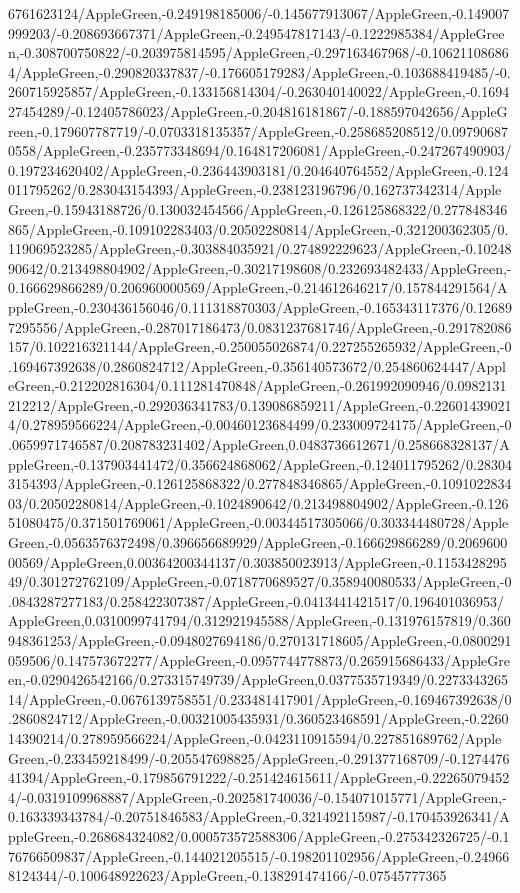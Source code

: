 {\begin{tikzternal}
{6761623124/AppleGreen,-0.249198185006/-0.145677913067/AppleGreen,-0.149007999203/-0.208693667371/AppleGreen,-0.249547817143/-0.1222985384/AppleGreen,-0.308700750822/-0.203975814595/AppleGreen,-0.297163467968/-0.106211086864/AppleGreen,-0.290820337837/-0.176605179283/AppleGreen,-0.103688419485/-0.260715925857/AppleGreen,-0.133156814304/-0.263040140022/AppleGreen,-0.169427454289/-0.12405786023/AppleGreen,-0.204816181867/-0.188597042656/AppleGreen,-0.179607787719/-0.0703318135357/AppleGreen,-0.258685208512/0.097906870558/AppleGreen,-0.235773348694/0.164817206081/AppleGreen,-0.247267490903/0.197234620402/AppleGreen,-0.236443903181/0.204640764552/AppleGreen,-0.124011795262/0.283043154393/AppleGreen,-0.238123196796/0.162737342314/AppleGreen,-0.15943188726/0.130032454566/AppleGreen,-0.126125868322/0.277848346865/AppleGreen,-0.109102283403/0.20502280814/AppleGreen,-0.321200362305/0.119069523285/AppleGreen,-0.303884035921/0.274892229623/AppleGreen,-0.1024890642/0.213498804902/AppleGreen,-0.30217198608/0.232693482433/AppleGreen,-0.166629866289/0.206960000569/AppleGreen,-0.214612646217/0.157844291564/AppleGreen,-0.230436156046/0.111318870303/AppleGreen,-0.165343117376/0.126897295556/AppleGreen,-0.287017186473/0.0831237681746/AppleGreen,-0.291782086157/0.102216321144/AppleGreen,-0.250055026874/0.227255265932/AppleGreen,-0.169467392638/0.2860824712/AppleGreen,-0.356140573672/0.254860624447/AppleGreen,-0.212202816304/0.111281470848/AppleGreen,-0.261992090946/0.0982131212212/AppleGreen,-0.292036341783/0.139086859211/AppleGreen,-0.226014390214/0.278959566224/AppleGreen,-0.00460123684499/0.233009724175/AppleGreen,-0.0659971746587/0.208783231402/AppleGreen,0.0483736612671/0.258668328137/AppleGreen,-0.137903441472/0.356624868062/AppleGreen,-0.124011795262/0.283043154393/AppleGreen,-0.126125868322/0.277848346865/AppleGreen,-0.109102283403/0.20502280814/AppleGreen,-0.1024890642/0.213498804902/AppleGreen,-0.12651080475/0.371501769061/AppleGreen,-0.00344517305066/0.303344480728/AppleGreen,-0.0563576372498/0.396656689929/AppleGreen,-0.166629866289/0.206960000569/AppleGreen,0.00364200344137/0.303850023913/AppleGreen,-0.115342829549/0.301272762109/AppleGreen,-0.0718770689527/0.358940080533/AppleGreen,-0.0843287277183/0.258422307387/AppleGreen,-0.0413441421517/0.196401036953/AppleGreen,0.0310099741794/0.312921945588/AppleGreen,-0.131976157819/0.360948361253/AppleGreen,-0.0948027694186/0.270131718605/AppleGreen,-0.0800291059506/0.147573672277/AppleGreen,-0.0957744778873/0.265915686433/AppleGreen,-0.0290426542166/0.273315749739/AppleGreen,0.0377535719349/0.227334326514/AppleGreen,-0.0676139758551/0.233481417901/AppleGreen,-0.169467392638/0.2860824712/AppleGreen,-0.00321005435931/0.360523468591/AppleGreen,-0.226014390214/0.278959566224/AppleGreen,-0.0423110915594/0.227851689762/AppleGreen,-0.233459218499/-0.205547698825/AppleGreen,-0.291377168709/-0.127447641394/AppleGreen,-0.179856791222/-0.251424615611/AppleGreen,-0.222650794524/-0.0319109968887/AppleGreen,-0.202581740036/-0.154071015771/AppleGreen,-0.163339343784/-0.20751846583/AppleGreen,-0.321492115987/-0.170453926341/AppleGreen,-0.268684324082/0.000573572588306/AppleGreen,-0.275342326725/-0.176766509837/AppleGreen,-0.144021205515/-0.198201102956/AppleGreen,-0.249668124344/-0.100648922623/AppleGreen,-0.138291474166/-0.07545777365}
\end{tikzternal}}
